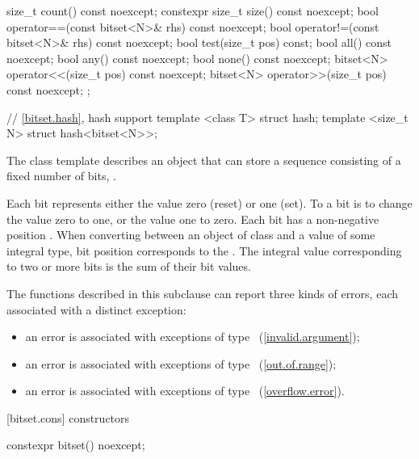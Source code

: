 \begin{codeblock}
{{    size_t count() const noexcept;
    constexpr size_t size() const noexcept;
    bool operator==(const bitset<N>& rhs) const noexcept;
    bool operator!=(const bitset<N>& rhs) const noexcept;
    bool test(size_t pos) const;
    bool all() const noexcept;
    bool any() const noexcept;
    bool none() const noexcept;
    bitset<N> operator<<(size_t pos) const noexcept;
    bitset<N> operator>>(size_t pos) const noexcept;
  };

  // \ref{bitset.hash}, hash support
  template <class T> struct hash;
  template <size_t N> struct hash<bitset<N>>;
}
\end{codeblock}

\pnum
The class template
%
describes an object that can store a sequence consisting of a fixed number of
bits, .

\pnum
Each bit represents either the value zero (reset) or one (set).
To
a bit is to change the value zero to one, or the value one to
zero.
Each bit has a non-negative position .
When converting
between an object of class
and a value of some
integral type, bit position  corresponds to the
.
The integral value corresponding to two
or more bits is the sum of their bit values.

\pnum
The functions described in this subclause can report three kinds of
errors, each associated with a distinct exception:

\begin{itemize}
\item
an
error is associated with exceptions of type
~(\ref{invalid.argument});
%
\item
an
error is associated with exceptions of type
~(\ref{out.of.range});
%
\item
an
error is associated with exceptions of type
~(\ref{overflow.error}).
%
\end{itemize}

[bitset.cons]{ constructors}

%
\begin{itemdecl}
constexpr bitset() noexcept;
\end{itemdecl}

